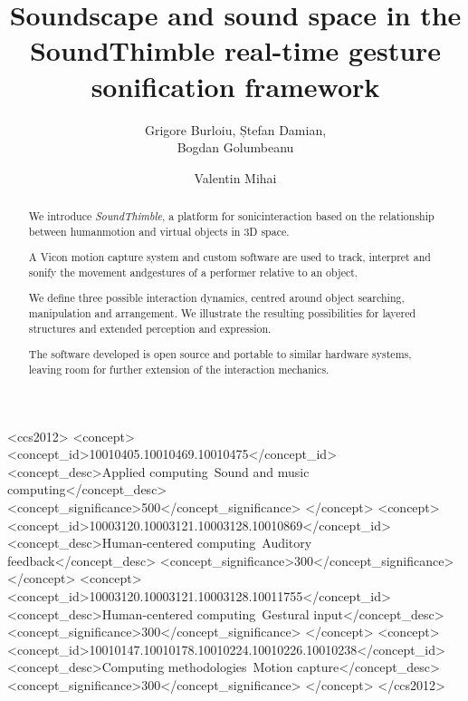 \documentclass[sigchi, review]{acmart}
\begin{document}
\title{Soundscape and sound space in the SoundThimble real-time gesture sonification framework}

\author{Grigore Burloiu, Ștefan Damian,\\ Bogdan Golumbeanu}

\author{Valentin Mihai}


\begin{abstract}
We introduce \textit{SoundThimble}, a platform for sonic\linebreak interaction based on the relationship between human\linebreak motion and virtual objects in 3D space.

A Vicon motion capture system and custom software are used to track, interpret and sonify the movement and\linebreak gestures of a performer relative to an object.

We define three possible interaction dynamics, centred around object searching, manipulation and arrangement. We illustrate the resulting possibilities for layered structures and extended perception and expression.

The software developed is open source and portable to similar hardware systems, leaving room for further extension of the interaction mechanics.
\end{abstract}

%
%
\begin{CCSXML}
 <ccs2012>
 <concept>
 <concept_id>10010405.10010469.10010475</concept_id>
 <concept_desc>Applied computing~Sound and music computing</concept_desc>
 <concept_significance>500</concept_significance>
 </concept>
 <concept>
 <concept_id>10003120.10003121.10003128.10010869</concept_id>
 <concept_desc>Human-centered computing~Auditory feedback</concept_desc>
 <concept_significance>300</concept_significance>
 </concept>
 <concept>
 <concept_id>10003120.10003121.10003128.10011755</concept_id>
 <concept_desc>Human-centered computing~Gestural input</concept_desc>
 <concept_significance>300</concept_significance>
 </concept>
 <concept>
 <concept_id>10010147.10010178.10010224.10010226.10010238</concept_id>
 <concept_desc>Computing methodologies~Motion capture</concept_desc>
 <concept_significance>300</concept_significance>
 </concept>
 </ccs2012>
\end{CCSXML}
\end{document}
